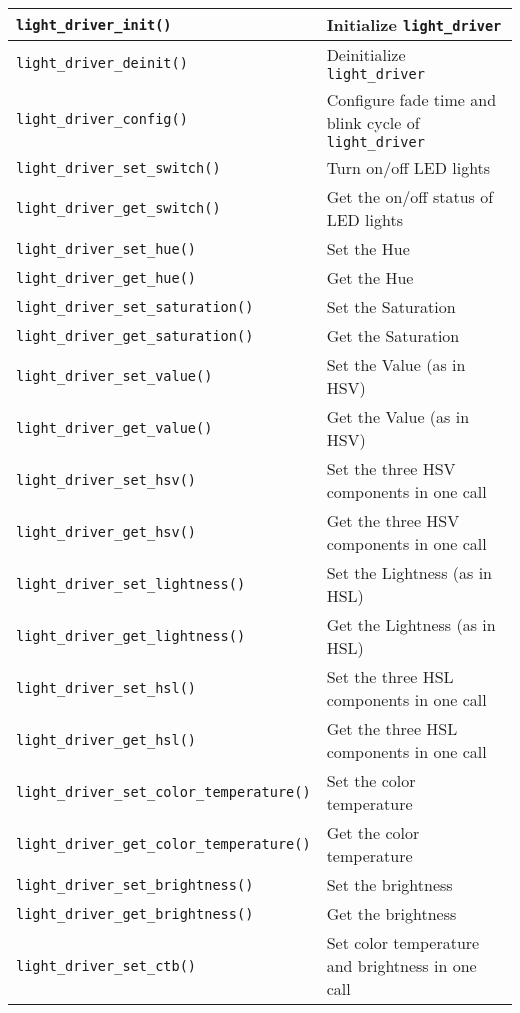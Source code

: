 \documentclass[a4paper,12pt]{book}
\begin{document}
{\begin{longtable}{|>{\footnotesize}m{}|>{\footnotesize}m{}|}
    \verb|light_driver_init()|&Initialize \verb|light_driver|\\
    \hline
    \verb|light_driver_deinit()|&Deinitialize \verb|light_driver|\\
    \hline
    \verb|light_driver_config()|&Configure fade time and blink cycle of \verb|light_driver|\\
    \hline
    \verb|light_driver_set_switch()|&Turn on/off LED lights\\
    \hline
    \verb|light_driver_get_switch()|&Get the on/off status of LED lights\\
    \hline
    \verb|light_driver_set_hue()|&Set the Hue\\
    \hline
    \verb|light_driver_get_hue()|&Get the Hue\\
    \hline
    \verb|light_driver_set_saturation()|&Set the Saturation\\
    \hline
    \verb|light_driver_get_saturation()|&Get the Saturation\\
    \hline
    \verb|light_driver_set_value()|&Set the Value (as in HSV)\\
    \hline
    \verb|light_driver_get_value()|&Get the Value (as in HSV)\\
    \hline
    \verb|light_driver_set_hsv()|&Set the three HSV components in one call\\
    \hline
    \verb|light_driver_get_hsv()|&Get the three HSV components in one call\\
    \hline
    \verb|light_driver_set_lightness()|&Set the Lightness (as in HSL)\\
    \hline
    \verb|light_driver_get_lightness()|&Get the Lightness (as in HSL)\\
    \hline
    \verb|light_driver_set_hsl()|&Set the three HSL components in one call\\
    \hline
    \verb|light_driver_get_hsl()|&Get the three HSL components in one call\\
    \hline
    \verb|light_driver_set_color_temperature()|&Set the color temperature\\
    \hline
    \verb|light_driver_get_color_temperature()|&Get the color temperature\\
    \hline
    \verb|light_driver_set_brightness()|&Set the brightness\\
    \hline
    \verb|light_driver_get_brightness()|&Get the brightness\\
    \hline
    \verb|light_driver_set_ctb()|&Set color temperature and brightness in one call\\

\end{longtable}}
\end{document}
